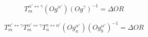 $$T_{m}^{\alpha'\leftrightarrow\gamma}\left(Og^{\alpha'}\right)\left(Og^{\gamma}\right)^{-1}=\Delta OR\label{eq:1}$$

$$T_{m}^{\alpha'\leftrightarrow\gamma}T_{m}^{\alpha'\leftrightarrow\gamma}T_{n}^{\gamma\leftrightarrow\alpha'}\left(Og_{a}^{\alpha'}\right)\left(Og_{b}^{\alpha'}\right)^{-1}=\Delta OR\label{eq:2}$$
